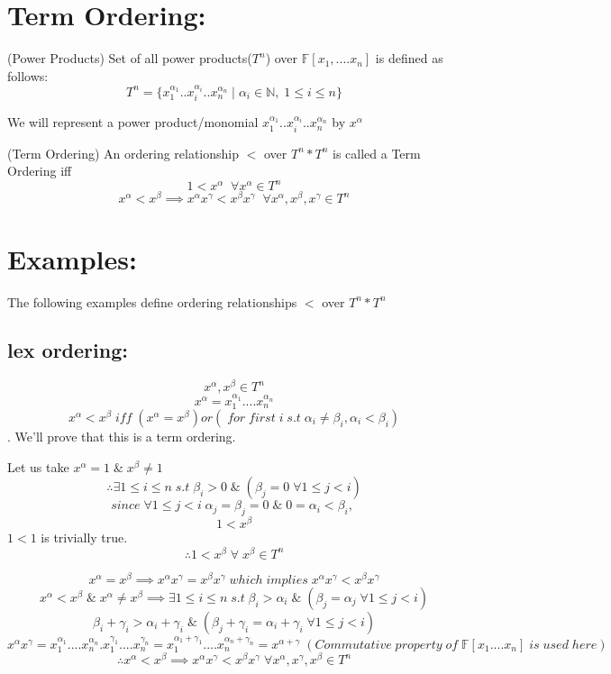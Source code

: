 \section*{Term Ordering:}
\begin{definition}(Power Products)
Set of all power products($T^n$) over $\mathbb{F}[x_1,....x_n]$ is defined as follows:
$$T^n=\{x_{1}^{\alpha_{1}}..x_{i}^{\alpha_{i}}..x_{n}^{\alpha_{n}}\;|\; \alpha_{i}\in \mathbb{N},\;1\leq i\leq n\}$$
\end{definition}
We will represent a power product/monomial $x_{1}^{\alpha_{1}}..x_{i}^{\alpha_{i}}..x_{n}^{\alpha_{n}}$ by $x^{\alpha}$ 
\begin{definition}(Term Ordering)
An ordering relationship $<$ over $T^n*T^n$ is called a Term Ordering iff
$$1<x^{\alpha}\;\; \forall x^{\alpha}\in T^n$$
$$x^{\alpha}<x^{\beta}\implies x^{\alpha}x^{\gamma}<x^{\beta}x^{\gamma}\;\;\forall x^{\alpha},x^{\beta},x^{\gamma}\in T^n$$
\end{definition}
\section*{Examples:}
The following examples define ordering relationships $<$ over $T^{n}*T^{n}$
\subsection*{lex ordering:}
$$x^{\alpha},x^{\beta} \in T^{n}$$
$$x^{\alpha}=x_{1}^{\alpha_{1}}....x_{n}^{\alpha_{n}}$$
$$x^{\alpha}<x^{\beta}\; iff \;(x^{\alpha}=x^{\beta}) or ( \;for \;first \;i \;s.t\; \alpha_{i}\neq \beta_{i} , \alpha_{i}<\beta_{i})$$.
We'll prove that this is a term ordering.

Let us take $x^{\alpha}=1\;\&\;x^{\beta}\neq1$
$$\therefore\exists 1\leq i\leq n\;s.t\;\beta_{i}>0 \;\&\;(\beta_{j}=0 \;\forall 1\leq j<i)$$
$$since\;\forall 1\leq j<i \;\alpha_{j}=\beta_{j}=0\;\&\;0=\alpha_{i}<\beta_{i},\;$$
$$1<x^{\beta}$$
$1<1$ is trivially true.
$$\therefore1<x^{\beta}\;\forall\;x^{\beta}\in T^{n}$$

$$x^{\alpha}=x^{\beta} \implies x^{\alpha}x^{\gamma}=x^{\beta}x^{\gamma}\;which\;implies\;x^{\alpha}x^{\gamma}<x^{\beta}x^{\gamma}$$
$$x^{\alpha}<x^{\beta} \;\&\;x^{\alpha}\neq x^{\beta}\implies \exists 1\leq i\leq n\;s.t\;\beta_{i}>\alpha_{i} \;\&\;(\beta_{j}=\alpha_{j} \;\forall 1\leq j<i)$$ 
$$\beta_{i}+\gamma_{i}>\alpha_{i}+\gamma_{i} \;\&\;(\beta_{j}+\gamma_{i}=\alpha_{i}+\gamma_{i} \;\forall 1\leq j<i)$$
$$x^{\alpha}x^{\gamma}=x_{1}^{\alpha_{1}}....x_{n}^{\alpha_{n}}.x_{1}^{\gamma_{1}}....x_{n}^{\gamma_{n}}=x_{1}^{\alpha_{1}+\gamma_{1}}....x_{n}^{\alpha_{n}+\gamma_{n}}=x^{\alpha+\gamma}\;(Commutative \;property \;of \;\mathbb{F}[x_{1}....x_{n}] \;is \;used \;here) $$
$$\therefore x^{\alpha}<x^{\beta}\implies x^{\alpha}x^{\gamma}<x^{\beta}x^{\gamma}\; \forall x^{\alpha},x^{\gamma},x^{\beta}\in T^{n}$$
